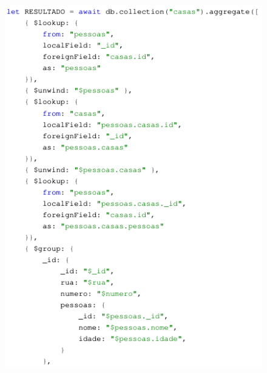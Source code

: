 \documentclass{beamer} %
\begin{document}
\begin{frame}
\vspace*{-0.8cm}
\begin{columns}
    
    \begin{figure}
        \centering
        \includegraphics[height=\textheight]{imagens/query-lookup-part-1.png}
        \label{fig:query-lookup-part-1}
    \end{figure}

    

\end{columns}
\end{frame}
\end{document}
